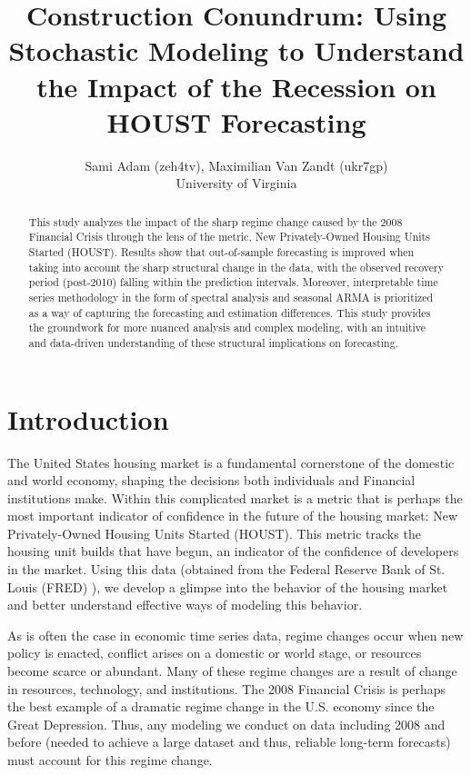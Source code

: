 \documentclass[10pt,twocolumn,letterpaper]{article}
\begin{document}
\title{Construction Conundrum: Using Stochastic Modeling to Understand the Impact of the Recession on HOUST Forecasting}

\author{Sami Adam (zeh4tv), Maximilian Van Zandt (ukr7gp)\\
University of Virginia\\
}

\maketitle

\begin{abstract}
This study analyzes the impact of the sharp regime change caused by the 2008 Financial Crisis through the lens of the metric, New Privately-Owned Housing Units Started (HOUST). Results show that out-of-sample forecasting is improved when taking into account the sharp structural change in the data, with the observed recovery period (post-2010) falling within the prediction intervals. Moreover, interpretable time series methodology in the form of spectral analysis and seasonal ARMA is prioritized as a way of capturing the forecasting and estimation differences. This study provides the groundwork for more nuanced analysis and complex modeling, with an intuitive and data-driven understanding of these structural implications on forecasting.
\end{abstract}


\section{Introduction}
\label{sec:intro}

The United States housing market is a fundamental cornerstone of the domestic and world economy, shaping the decisions both individuals and Financial institutions make. Within this complicated market is a metric that is perhaps the most important indicator of confidence in the future of the housing market: New Privately-Owned Housing Units Started (HOUST). This metric tracks the housing unit builds that have begun, an indicator of the confidence of developers in the market. Using this data (obtained from the Federal Reserve Bank of St. Louis (FRED) \cite{fred2025houst}), we develop a glimpse into the behavior of the housing market and better understand effective ways of modeling this behavior.

As is often the case in economic time series data, regime changes occur when new policy is enacted, conflict arises on a domestic or world stage, or resources become scarce or abundant. Many of these regime changes are a result of change in resources, technology, and institutions. The 2008 Financial Crisis is perhaps the best example of a  dramatic regime change in the U.S. economy since the Great Depression. Thus, any modeling we conduct on data including 2008 and before (needed to achieve a large dataset and thus, reliable long-term forecasts) must account for this regime change. 
\end{document}
